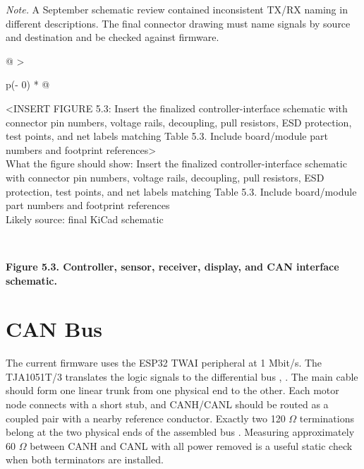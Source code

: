 \emph{Note.} A September schematic review contained inconsistent TX\slash{}RX
naming in different descriptions. The final connector drawing must name
signals by source and destination and be checked against firmware.

\begin{longtable}[]{@{}
  >{\raggedright\arraybackslash}p{(\columnwidth - 0\tabcolsep) * }@{}}
\toprule\noalign{}
\begin{minipage}[b]{\linewidth}\raggedright
\textless INSERT FIGURE 5.3: Insert the finalized controller-interface
schematic with connector pin numbers, voltage rails, decoupling, pull
resistors, ESD protection, test points, and net labels matching Table
5.3. Include board\slash{}module part numbers and footprint
references\textgreater{}\\
What the figure should show: Insert the finalized controller-interface
schematic with connector pin numbers, voltage rails, decoupling, pull
resistors, ESD protection, test points, and net labels matching Table
5.3. Include board\slash{}module part numbers and footprint references\\
Likely source: final KiCad schematic\strut
\end{minipage} \\
\midrule\noalign{}
\endhead
\bottomrule\noalign{}
\endlastfoot
\end{longtable}

\begin{center}\singlespacing
{}
\textbf{Figure 5.3. Controller, sensor, receiver, display, and CAN interface schematic.}
\end{center}

\section{CAN Bus}\label{can-bus}

The current firmware uses the ESP32 TWAI peripheral at 1 Mbit\slash{}s. The
TJA1051T\slash{}3 translates the logic signals to the differential bus
\cite{espressif2026twai}, \cite{nxp2026tja1051}. The main cable should form one linear trunk from one
physical end to the other. Each motor node connects with a short stub,
and CANH\slash{}CANL should be routed as a coupled pair with a nearby reference
conductor. Exactly two 120 \ensuremath{\Omega} terminations belong at the two physical
ends of the assembled bus \cite{ti2026tida01238}. Measuring approximately 60 \ensuremath{\Omega} between
CANH and CANL with all power removed is a useful static check when both
terminators are installed.

